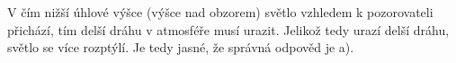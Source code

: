 \documentclass{../../../../style/mkimain}
\begin{document}
\noindent{}
\klein
V čím nižší úhlové výšce (výšce nad obzorem) světlo vzhledem k pozorovateli přichází, tím delší dráhu v atmosféře musí urazit.
Jelikož tedy urazí delší dráhu, světlo se více rozptýlí. Je tedy jasné, že správná odpověd je a).
\end{document}
